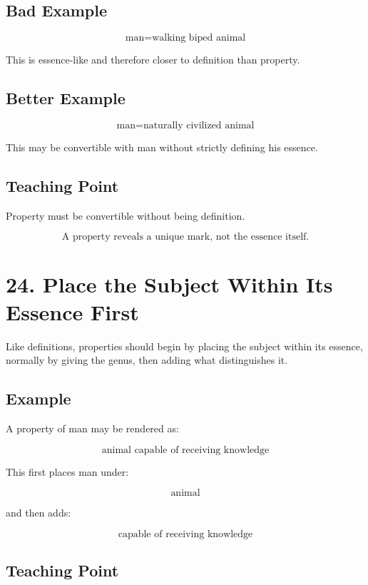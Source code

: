 \documentclass[12pt]{article}
\begin{document}
\subsection*{Bad Example}

\[
\text{man} = \text{walking biped animal}
\]

This is essence-like and therefore closer to definition than property.

\subsection*{Better Example}

\[
\text{man} = \text{naturally civilized animal}
\]

This may be convertible with man without strictly defining his essence.

\subsection*{Teaching Point}

Property must be convertible without being definition.

\[
\boxed{
\text{A property reveals a unique mark, not the essence itself.}
}
\]

\section*{24. Place the Subject Within Its Essence First}

Like definitions, properties should begin by placing the subject within its
essence, normally by giving the genus, then adding what distinguishes it.

\subsection*{Example}

A property of man may be rendered as:

\[
\text{animal capable of receiving knowledge}
\]

This first places man under:

\[
\text{animal}
\]

and then adds:

\[
\text{capable of receiving knowledge}
\]

\subsection*{Teaching Point}
\end{document}
